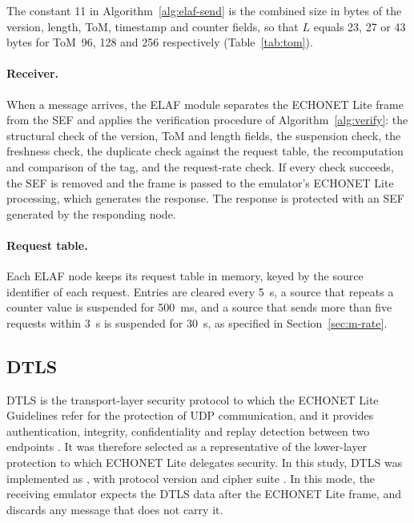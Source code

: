 The constant 11 in Algorithm~\ref{alg:elaf-send} is the combined size in bytes of the version, length, ToM, timestamp and counter fields, so that $L$ equals 23, 27 or 43 bytes for ToM~96, 128 and 256 respectively (Table~\ref{tab:tom}).

\paragraph{Receiver.} When a message arrives, the ELAF module separates the ECHONET Lite frame from the SEF and applies the verification procedure of Algorithm~\ref{alg:verify}: the structural check of the version, ToM and length fields, the suspension check, the freshness check, the duplicate check against the request table, the recomputation and comparison of the tag, and the request-rate check. If every check succeeds, the SEF is removed and the frame is passed to the emulator's ECHONET Lite processing, which generates the response. The response is protected with an SEF generated by the responding node.

\paragraph{Request table.} Each ELAF node keeps its request table in memory, keyed by the source identifier of each request. Entries are cleared every 5~s, a source that repeats a counter value is suspended for 500~ms, and a source that sends more than five requests within 3~s is suspended for 30~s, as specified in Section~\ref{sec:m-rate}.

\subsection{DTLS}
\label{sec:i-dtls}

DTLS is the transport-layer security protocol to which the ECHONET Lite Guidelines refer for the protection of UDP communication, and it provides authentication, integrity, confidentiality and replay detection between two endpoints \citep{ECHONETGuidelines,RFC6347,RFC9147}. It was therefore selected as a representative of the lower-layer protection to which ECHONET Lite delegates security. In this study, DTLS was implemented as \tbd{}, with protocol version \tbd{} and cipher suite \tbd{}. In this mode, the receiving emulator expects the DTLS data after the ECHONET Lite frame, and discards any message that does not carry it.

